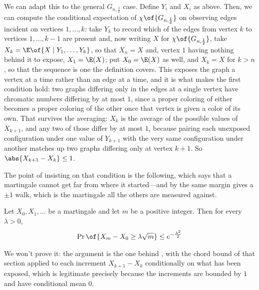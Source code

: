 We can adapt this to the general $G_{n, \frac{1}{2}}$ case. Define $Y_i$ and $X_i$ as above. Then, we can compute the conditional expectation of $\chi\of{G_{n, \frac{1}{2}}}$ on observing edges incident on vertices $1, \ldots, k$: take $Y_k$ to record which of the edges from vertex $k$ to vertices $1, \ldots, k-1$ are present and, now writing $X$ for $\chi\of{G_{n, \frac{1}{2}}}$, take $X_k = \E\of{X \mid Y_1, \ldots, Y_k}$, so that $X_n = X$ and, vertex $1$ having nothing behind it to expose, $X_1 = \E(X)$; put $X_0 = \E(X)$ as well, and $X_k = X$ for $k > n$, so that the sequence is one the definition covers. This exposes the graph a vertex at a time rather than an edge at a time, and it is what makes the first condition hold: two graphs differing only in the edges at a single vertex have chromatic numbers differing by at most $1$, since a proper coloring of either becomes a proper coloring of the other once that vertex is given a color of its own. That survives the averaging: $X_k$ is the average of the possible values of $X_{k+1}$, and any two of those differ by at most $1$, because pairing each unexposed configuration under one value of $Y_{k+1}$ with the very same configuration under another matches up two graphs differing only at vertex $k+1$. So $\abs{X_{k+1} - X_k} \leq 1$.

The point of insisting on that condition is the following, which says that a martingale cannot get far from where it started---and by the same margin  gives a $\pm 1$ walk, which is the martingale all the others are measured against.

\begin{boxtheorem} \label{Ch3:Thm:Azuma}
    Let $X_0, X_1, \ldots$ be a martingale and let $m$ be a positive integer. Then for every $\lambda > 0$,
    \begin{align*}
        \Pr\of{X_m - X_0 \geq \lambda \sqrt{m}} \leq e^{-\frac{\lambda^2}{2}}
    \end{align*}
\end{boxtheorem}

We won't prove it: the argument is the one behind , with the chord bound of that section applied to each increment $X_{k+1} - X_k$ conditionally on what has been exposed, which is legitimate precisely because the increments are bounded by $1$ and have conditional mean $0$.


